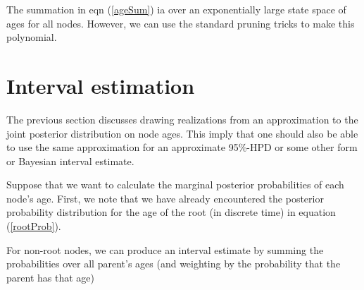 \documentclass{llncs}
\begin{document}
The summation in eqn (\ref{ageSum}) ia over an exponentially large state space of ages for all nodes.
However, we can use the standard pruning tricks to make this polynomial.

\section{Interval estimation}
The previous section discusses drawing realizations from an approximation to the joint posterior distribution on node ages.
This imply that one should also be able to use the same approximation for an approximate 95\%-HPD or some other
    form or Bayesian interval estimate.

Suppose that we want to calculate the marginal posterior probabilities of each node's age.
First, we note that we have already encountered the posterior probability distribution for the age
    of the root (in discrete time) in equation (\ref{rootProb}).

For non-root nodes, we can produce an interval estimate by summing the probabilities over
    all parent's ages (and weighting by the probability that the parent has that age)
\newpage
\end{document}
